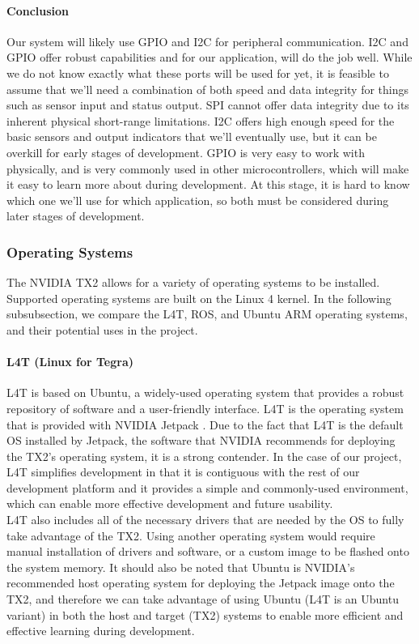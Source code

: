 \paragraph{Conclusion}
Our system will likely use GPIO and I2C for peripheral communication. I2C and GPIO offer robust capabilities and for our application, will do the job well. While we do not know exactly what these ports will be used for yet, it is feasible to assume that we'll need a combination of both speed and data integrity for things such as sensor input and status output. SPI cannot offer data integrity due to its inherent physical short-range limitations. I2C offers high enough speed for the basic sensors and output indicators that we'll eventually use, but it can be overkill for early stages of development. GPIO is very easy to work with physically, and is very commonly used in other microcontrollers, which will make it easy to learn more about during development. At this stage, it is hard to know which one we'll use for which application, so both must be considered during later stages of development.

\newpage
\subsubsection{Operating Systems}
The NVIDIA TX2 allows for a variety of operating systems to be installed. Supported operating systems are built on the Linux 4 kernel. In the following subsubsection, we compare the L4T, ROS, and Ubuntu ARM operating systems, and their potential uses in the project.

\paragraph{L4T (Linux for Tegra)}
L4T is based on Ubuntu, a widely-used operating system that provides a robust repository of software and a user-friendly interface. L4T is the operating system that is provided with NVIDIA Jetpack \cite{jetsonSoft}. Due to the fact that L4T is the default OS installed by Jetpack, the software that NVIDIA recommends for deploying the TX2's operating system, it is a strong contender. In the case of our project, L4T simplifies development in that it is contiguous with the rest of our development platform and it provides a simple and commonly-used environment, which can enable more effective development and future usability.\\

L4T also includes all of the necessary drivers that are needed by the OS to fully take advantage of the TX2. Using another operating system would require manual installation of drivers and software, or a custom image to be flashed onto the system memory. It should also be noted that Ubuntu is NVIDIA's recommended host operating system for deploying the Jetpack image onto the TX2, and therefore we can take advantage of using Ubuntu (L4T is an Ubuntu variant) in both the host and target (TX2) systems to enable more efficient and effective learning during development.

